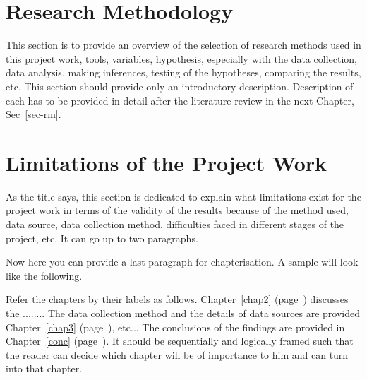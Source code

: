 \section{Research Methodology}\label{sec-rm-intro}

This section is to provide an overview of the selection of research methods used in this project work, tools, variables, hypothesis,  especially with the data collection, data analysis, making inferences, testing of the hypotheses, comparing the results, etc. This section  should provide only an introductory description. Description of each has to be provided in detail after the literature review in the next Chapter, Sec~\ref{sec-rm}.



\section{Limitations of the Project Work}
As the title says, this section is dedicated to explain what limitations exist for the project work in terms of the validity of the results because of the method used, data source, data collection method, difficulties faced in different stages of the project, etc. It can go up to two paragraphs.

Now here you can provide a last paragraph for chapterisation. A sample will look like the following.

Refer the chapters by their labels as follows. Chapter~\ref{chap2} (page~\pageref{chap2}) discusses the  ........ The data collection method and the details of data sources are provided  Chapter~\ref{chap3} (page~\pageref{chap3}),    etc... The conclusions of the findings are provided in Chapter~\ref{conc} (page~\pageref{conc}). It should be sequentially and logically framed such that the reader can decide which chapter will be of importance to him and can turn into that chapter.
